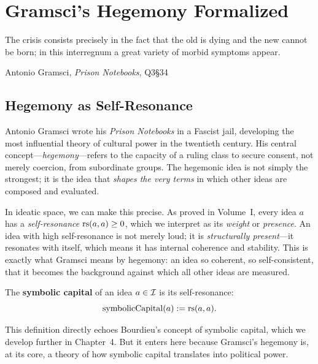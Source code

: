 
\chapter{Gramsci's Hegemony Formalized}
\label{ch:hegemony}

\epigraph{The crisis consists precisely in the fact that the old is dying and the new cannot be born; in this interregnum a great variety of morbid symptoms appear.}{Antonio Gramsci, \textit{Prison Notebooks}, Q3\S34}

\section{Hegemony as Self-Resonance}

Antonio Gramsci wrote his \textit{Prison Notebooks} in a Fascist jail, developing the most
influential theory of cultural power in the twentieth century. His central concept---\emph{hegemony}---refers
to the capacity of a ruling class to secure consent, not merely coercion, from
subordinate groups. The hegemonic idea is not simply the strongest; it is the
idea that \emph{shapes the very terms} in which other ideas are composed and evaluated.

In ideatic space, we can make this precise. As proved in Volume~I, every idea $a$
has a \emph{self-resonance} $\mathrm{rs}(a,a) \geq 0$, which we interpret as its
\emph{weight} or \emph{presence}. An idea with high self-resonance is not merely
loud; it is \emph{structurally present}---it resonates with itself, which means
it has internal coherence and stability. This is exactly what Gramsci means by
hegemony: an idea so coherent, so self-consistent, that it becomes the
background against which all other ideas are measured.

\begin{definition}
\label{def:symbolic-capital}
The \textbf{symbolic capital} of an idea $a \in \mathcal{I}$ is its self-resonance:
\[
  \mathrm{symbolicCapital}(a) := \mathrm{rs}(a, a).
\]
\end{definition}

This definition directly echoes Bourdieu's concept of symbolic capital, which we
develop further in Chapter~4. But it enters here because Gramsci's hegemony is,
at its core, a theory of how symbolic capital translates into political power.

